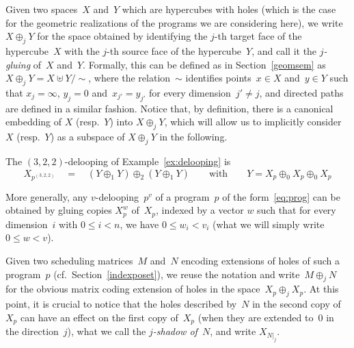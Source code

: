 \documentclass[orivec]{llncs} \usepackage[T1]{fontenc}
\newcommand{\nbd}{\nobreakdash-\hspace{0pt}}
\newcommand{\cf}{cf.~}
\newcommand{\resp}{resp.~}
\newcommand{\qeq}{\quad=\quad}
\newcommand{\glue}[1]{\oplus_{#1}}
\renewcommand{\leq}{\leqslant}
\begin{document}
Given two spaces~$X$ and~$Y$ which are hypercubes with holes (which is the case
for the geometric realizations of the programs we are considering here), we
write $X\glue jY$ for the space obtained by identifying the $j$-th target face
of the hypercube~$X$ with the $j$\nbd{}th source face of the hypercube~$Y$, and
call it the \emph{$j$\nbd{}gluing} of~$X$ and~$Y$. Formally, this can be defined
as in Section~\ref{geomsem} as $X\glue jY=X\uplus Y/\sim$, where the
relation~$\sim$ identifies points~$x\in X$ and~$y\in Y$ such that $x_j=\infty$,
$y_j=0$ and~$x_{j'}=y_{j'}$ for every dimension~$j'\neq j$, and directed paths
are defined in a similar fashion. Notice that, by definition, there is a
canonical embedding of $X$ (\resp $Y$) into $X\glue jY$, which will allow us to
implicitly consider~$X$ (\resp $Y$) as a subspace of $X\glue jY$ in the
following.

\begin{example}
  \label{ex:glue322}
  The $(3,2,2)$-delooping of Example~\ref{ex:delooping} is
  \[
  X_{p^{(3,2,2)}}
  \qeq
  (Y\glue 1 Y)\glue 2(Y\glue 1 Y)
  \qquad
  \text{with}
  \qquad
  Y=X_p\glue 0X_p\glue 0X_p
  \]
\end{example}

\noindent
More generally, any $v$\nbd{}delooping~$p^v$ of a program~$p$ of the
form~\eqref{eq:prog} can be obtained by gluing copies $X_p^w$ of~$X_p$, indexed
by a vector $w$ such that for every dimension~$i$ with $0\leq i<n$, we have
$0\leq w_i<v_i$ (what we will simply write $0\leq w<v$).

\newcommand{\shadow}[2]{#2|_{#1}}

Given two scheduling matrices~$M$ and~$N$ encoding extensions of holes of such a
program~$p$ (\cf Section~\ref{indexposet}), we reuse the notation and
write~$M\glue j N$ for the obvious matrix coding extension of holes in the
space~$X_p\glue j X_p$. At this point, it is crucial to notice that the holes
described by~$N$ in the second copy of~$X_p$ can have an effect on the first
copy of~$X_p$ (when they are extended to~$0$ in the direction~$j$), what we call
the \emph{$j$-shadow of~$N$}, and write $X_{\shadow jN}$.
\end{document}
